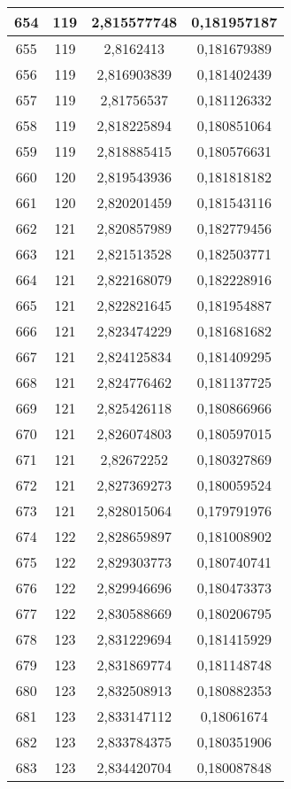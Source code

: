 {\begin{minipage}[!h]{0.45\textwidth}
\begin{longtable}{cccc}
654 & 119 & 2,815577748 & 0,181957187 \\ \hline
655 & 119 & 2,8162413 & 0,181679389 \\ \hline
656 & 119 & 2,816903839 & 0,181402439 \\ \hline
657 & 119 & 2,81756537 & 0,181126332 \\ \hline
658 & 119 & 2,818225894 & 0,180851064 \\ \hline
659 & 119 & 2,818885415 & 0,180576631 \\ \hline
660 & 120 & 2,819543936 & 0,181818182 \\ \hline
661 & 120 & 2,820201459 & 0,181543116 \\ \hline
662 & 121 & 2,820857989 & 0,182779456 \\ \hline
663 & 121 & 2,821513528 & 0,182503771 \\ \hline
664 & 121 & 2,822168079 & 0,182228916 \\ \hline
665 & 121 & 2,822821645 & 0,181954887 \\ \hline
666 & 121 & 2,823474229 & 0,181681682 \\ \hline
667 & 121 & 2,824125834 & 0,181409295 \\ \hline
668 & 121 & 2,824776462 & 0,181137725 \\ \hline
669 & 121 & 2,825426118 & 0,180866966 \\ \hline
670 & 121 & 2,826074803 & 0,180597015 \\ \hline
671 & 121 & 2,82672252 & 0,180327869 \\ \hline
672 & 121 & 2,827369273 & 0,180059524 \\ \hline
673 & 121 & 2,828015064 & 0,179791976 \\ \hline
674 & 122 & 2,828659897 & 0,181008902 \\ \hline
675 & 122 & 2,829303773 & 0,180740741 \\ \hline
676 & 122 & 2,829946696 & 0,180473373 \\ \hline
677 & 122 & 2,830588669 & 0,180206795 \\ \hline
678 & 123 & 2,831229694 & 0,181415929 \\ \hline
679 & 123 & 2,831869774 & 0,181148748 \\ \hline
680 & 123 & 2,832508913 & 0,180882353 \\ \hline
681 & 123 & 2,833147112 & 0,18061674 \\ \hline
682 & 123 & 2,833784375 & 0,180351906 \\ \hline
683 & 123 & 2,834420704 & 0,180087848 \\ \hline

\end{longtable}
\end{minipage}}
